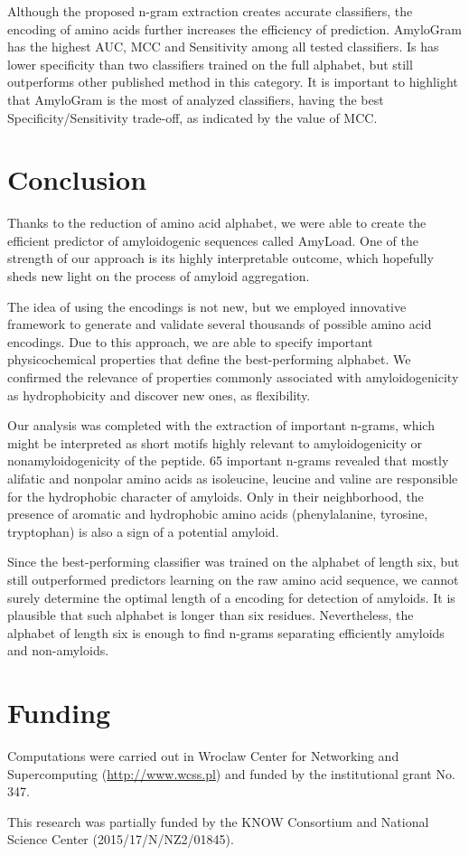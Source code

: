 \documentclass[a4,center,fleqn]{NAR}
\begin{document}
  Although the proposed n-gram extraction creates accurate classifiers, the 
encoding of amino acids further increases the efficiency of prediction. 
AmyloGram has the highest AUC, MCC and Sensitivity among all tested classifiers. 
Is has lower specificity than two classifiers trained on the full alphabet, but 
still outperforms other published method in this category. It is important to 
highlight that AmyloGram is the most  of analyzed classifiers, having 
the best Specificity/Sensitivity trade-off, as indicated by the value of MCC.

\section{Conclusion}

Thanks to the reduction of amino acid alphabet, we were able to create the 
efficient predictor of amyloidogenic sequences called AmyLoad. One of the 
strength of our approach is its highly interpretable outcome, which hopefully 
sheds new light on the process of amyloid aggregation.

  The idea of using the encodings is not new, but we employed 
innovative framework to generate and validate several thousands of possible 
amino acid encodings. Due to this approach, we are able to specify important 
physicochemical properties that define the best-performing alphabet. We 
confirmed the relevance of properties commonly associated with amyloidogenicity 
as hydrophobicity and discover new ones, as flexibility.  

  Our analysis was completed with the extraction of important n-grams, which 
might be interpreted as short motifs highly relevant to amyloidogenicity or 
nonamyloidogenicity of the peptide. 65 important n-grams revealed that mostly 
alifatic and nonpolar amino acids as isoleucine, leucine and valine are 
responsible for the hydrophobic character of amyloids. Only in their 
neighborhood, the presence of aromatic and hydrophobic amino acids 
(phenylalanine, tyrosine, tryptophan) is also a sign of a potential amyloid. 

  Since the best-performing classifier was trained on the alphabet of length 
six, but still outperformed predictors learning on the raw amino acid sequence, 
we cannot surely determine the optimal length of a encoding 
for detection of amyloids. It is plausible that such alphabet is longer than 
six residues. Nevertheless, the alphabet of length six is enough to find 
n-grams separating efficiently amyloids and non-amyloids. 


\section*{Funding}

Computations were carried out in Wroclaw Center for Networking 
and Supercomputing (\url{http://www.wcss.pl}) and funded by the
institutional grant No. 347.

This research was partially funded by the KNOW Consortium and
National Science Center (2015/17/N/NZ2/01845).



\end{document}
